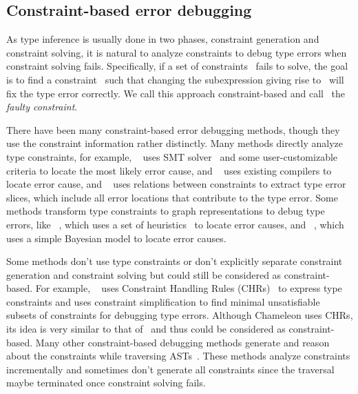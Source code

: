 \documentclass[12pt]{report}	%
\begin{document}
\subsection{Constraint-based error debugging}
\label{sec:background:leaves:constraint}

As type inference is usually done in two phases, constraint
generation and constraint solving, it is natural to
analyze constraints to debug type errors when constraint
solving fails.
%
Specifically, if a set
of constraints \cs\ fails to solve, the goal is to find
a constraint \con\ such that changing
the subexpression giving rise to \con\ will fix the type
error correctly. We call this approach constraint-based
and call \con\ the \emph{faulty constraint}.
%

There have been many constraint-based error debugging methods,
though they use the constraint information rather distinctly.
Many methods directly analyze type constraints,
for example, \toolMin~\cite{Pavlinovic14:FMT,Pavlinovic15:PST}
uses SMT solver~\cite{Nieuwenhuis06:SSS} and some
user-customizable criteria to locate the most likely error cause,
and \toolM~\cite{Loncaric16:PFT} uses existing
compilers to locate error cause, and \toolSk~\cite{Haack03:TES}
uses relations between constraints to extract type
error slices, which include all error locations that
contribute to the type error. Some methods transform type
constraints to graph representations to debug type errors,
like \toolH~\cite{Heeren03:HLH,Heeren05:TQT},
which uses a set of heuristics~\cite{Hage07:HTE} to locate
error causes, and
\toolS~\cite{Zhang14:tgd,Zhang15:DTE}, which uses a simple
Bayesian model to locate error causes.

Some methods don't use type constraints or don't
explicitly separate constraint generation and constraint
solving but could still be considered as
constraint-based. For example,
\toolCh~\cite{Stuckey03:ITD,Stuckey04:ITE,Wazny06:TIT}
uses Constraint Handling Rules (CHRs)~\cite{CHR}
to express type constraints and uses constraint
simplification to find minimal unsatisfiable
subsets of constraints for debugging type errors.
Although Chameleon uses CHRs, its idea is very
similar to that of \toolMin\ and thus could be considered
as constraint-based. Many other constraint-based debugging methods
generate and reason about the constraints while traversing
ASTs~\cite{Lee98:PAF,Lee00:GLP,Mcadam98:UST,Yang00:ETE,Wand86:FST,Duggan95:ETI,Chitil01:CET}.
%
These methods analyze constraints incrementally and
sometimes don't generate all constraints since the traversal
maybe terminated once constraint solving fails. 
\end{document}
